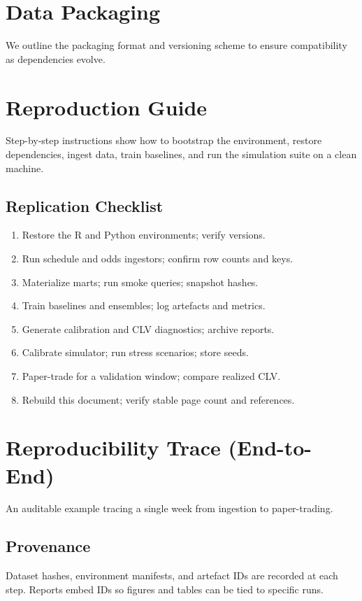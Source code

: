 \section{Data Packaging}\label{app:data-packaging}
We outline the packaging format and versioning scheme to ensure compatibility as dependencies evolve.

\section{Reproduction Guide}\label{app:reproduction-steps}
Step-by-step instructions show how to bootstrap the environment, restore dependencies, ingest data, train baselines, and run the simulation suite on a clean machine.

\subsection{Replication Checklist}
\begin{enumerate}
  \item Restore the R and Python environments; verify versions.
  \item Run schedule and odds ingestors; confirm row counts and keys.
  \item Materialize marts; run smoke queries; snapshot hashes.
  \item Train baselines and ensembles; log artefacts and metrics.
  \item Generate calibration and CLV diagnostics; archive reports.
  \item Calibrate simulator; run stress scenarios; store seeds.
  \item Paper-trade for a validation window; compare realized CLV.
  \item Rebuild this document; verify stable page count and references.
\end{enumerate}

\section{Reproducibility Trace (End-to-End)}\label{app:repro-trace}
An auditable example tracing a single week from ingestion to paper-trading.

\subsection{Provenance}
Dataset hashes, environment manifests, and artefact IDs are recorded at each step. Reports embed IDs so figures and tables can be tied to specific runs.

